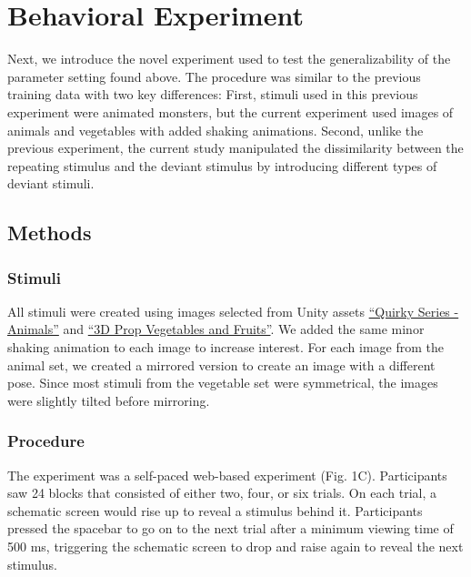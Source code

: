 \documentclass[10pt, letterpaper]{article}
\begin{document}
\hypertarget{behavioral-experiment}{%
\section{Behavioral Experiment}\label{behavioral-experiment}}

Next, we introduce the novel experiment used to test the
generalizability of the parameter setting found above. The procedure was
similar to the previous training data with two key differences: First,
stimuli used in this previous experiment were animated monsters, but the
current experiment used images of animals and vegetables with added
shaking animations. Second, unlike the previous experiment, the current
study manipulated the dissimilarity between the repeating stimulus and
the deviant stimulus by introducing different types of deviant stimuli.

\hypertarget{methods}{%
\subsection{Methods}\label{methods}}

\hypertarget{stimuli}{%
\subsubsection{Stimuli}\label{stimuli}}

All stimuli were created using images selected from Unity assets
\href{https://assetstore.unity.com/packages/3d/characters/animals/quirky-series-animals-mega-pack-vol-2-183280}{``Quirky
Series - Animals''} and
\href{https://assetstore.unity.com/packages/3d/props/food/3d-prop-vegetables-and-fruits-237790}{``3D
Prop Vegetables and Fruits''}. We added the same minor shaking animation
to each image to increase interest. For each image from the animal set,
we created a mirrored version to create an image with a different pose.
Since most stimuli from the vegetable set were symmetrical, the images
were slightly tilted before mirroring.

\hypertarget{procedure}{%
\subsubsection{Procedure}\label{procedure}}

The experiment was a self-paced web-based experiment (Fig. 1C).
Participants saw 24 blocks that consisted of either two, four, or six
trials. On each trial, a schematic screen would rise up to reveal a
stimulus behind it. Participants pressed the spacebar to go on to the
next trial after a minimum viewing time of 500 ms, triggering the
schematic screen to drop and raise again to reveal the next stimulus.
\end{document}
